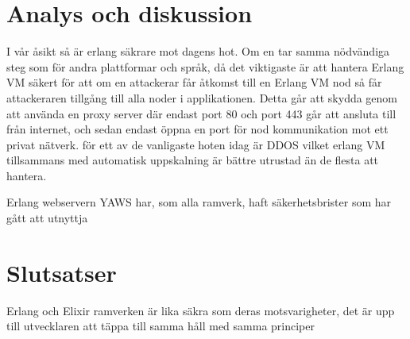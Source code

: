 \documentclass[12pt]{article}
\begin{document}
\section{	Analys och diskussion}


I vår åsikt så är erlang säkrare mot dagens hot.
 Om en tar samma nödvändiga steg som för andra plattformar och språk, då det viktigaste är att hantera Erlang VM säkert för att om en attackerar får åtkomst till en Erlang VM nod så får attackeraren tillgång till alla noder i applikationen.
 Detta går att skydda genom att använda en proxy \cite{101} server där endast port 80 och port 443 går att ansluta till från internet, och sedan endast öppna en port för nod kommunikation mot ett privat nätverk.
 för ett av de vanligaste hoten idag är DDOS vilket erlang VM tillsammans med automatisk uppskalning är bättre utrustad än de flesta att hantera.

Erlang webservern YAWS har, som alla ramverk, haft säkerhetsbrister som har gått att utnyttja \cite{exploit} 
	
\section{Slutsatser}


Erlang och Elixir ramverken är lika säkra som deras motsvarigheter, det är upp till utvecklaren att täppa till samma håll med samma principer
	
\end{document}
